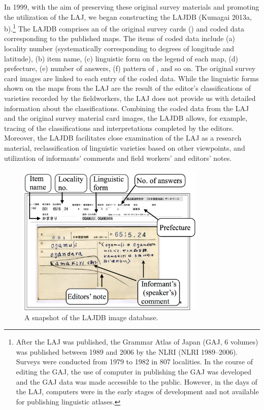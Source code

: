 \documentclass[output=paper]{LSP/langsci}
\begin{document}
In 1999, with the aim of preserving these original survey materials and promoting the utilization of the LAJ, we began constructing the LAJDB (Kumagai 2013a, b).\footnote{ After the LAJ was published, the Grammar Atlas of Japan (GAJ, 6 volumes) was published between 1989 and 2006 by the NLRI (NLRI 1989–2006). Surveys were conducted from 1979 to 1982 in 807 localities. In the course of editing the GAJ, the use of computer in publishing the GAJ was developed and the GAJ data was made accessible to the public. However, in the days of the LAJ, computers were in the early stages of development and not available for publishing linguistic atlases.} The LAJDB comprises an  of the original survey cards () and coded data corresponding to the published maps. The items of coded data include (a) locality number (systematically corresponding to degrees of longitude and latitude), (b) item name, (c) linguistic form on the legend of each map, (d) prefecture, (e) number of answers, (f) pattern of , and so on. The original survey card images are linked to each entry of the coded data. While the linguistic forms shown on the maps from the LAJ are the result of the editor’s classifications of varieties recorded by the fieldworkers, the LAJ does not provide us with detailed information about the classifications. Combining the coded data from the LAJ and the original survey material card images, the LAJDB allows, for example, tracing of the classifications and interpretations completed by the editors. Moreover, the LAJDB facilitates close examination of the LAJ as a research material, reclassification of linguistic varieties based on other viewpoints, and utilization of informants’ comments and field workers’ and editors’ notes.


\begin{figure}[t]
\includegraphics[width=0.8\textwidth]{illustrations/kuma_fig02}
\caption{A snapshot of the LAJDB image database.}        
\label{fig:2}
\end{figure} 
\end{document}
